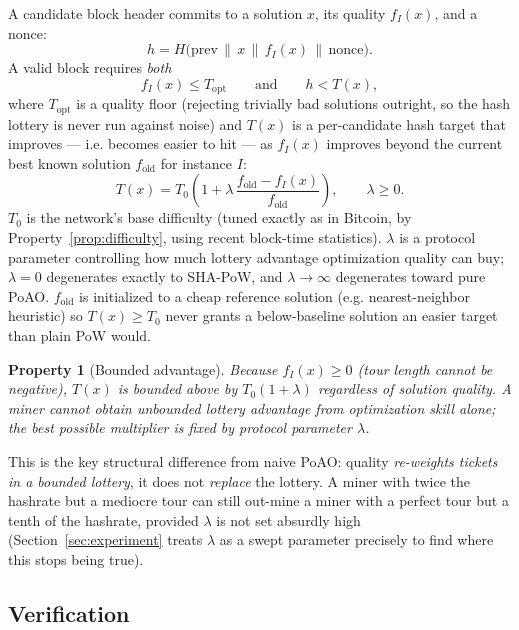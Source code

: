 \documentclass[journal]{IEEEtran}
\newtheorem{property}{Property}
\begin{document}
A candidate block header commits to a solution $x$, its quality $f_I(x)$, and
a nonce:
\[
h = H\big(\text{prev} \,\|\, x \,\|\, f_I(x) \,\|\, \text{nonce}\big).
\]
A valid block requires \emph{both}
\[
f_I(x) \le T_{\text{opt}}
\qquad\text{and}\qquad
h < T(x),
\]
where $T_{\text{opt}}$ is a quality floor (rejecting trivially bad solutions
outright, so the hash lottery is never run against noise) and $T(x)$ is a
per-candidate hash target that improves --- i.e. becomes easier to hit --- as
$f_I(x)$ improves beyond the current best known solution $f_{\text{old}}$ for
instance $I$:
\[
T(x) = T_0 \left( 1 + \lambda \, \frac{f_{\text{old}} - f_I(x)}{f_{\text{old}}} \right),
\qquad \lambda \ge 0 .
\]
$T_0$ is the network's base difficulty (tuned exactly as in Bitcoin, by
Property~\ref{prop:difficulty}, using recent block-time statistics). $\lambda$
is a protocol parameter controlling how much lottery advantage optimization
quality can buy; $\lambda = 0$ degenerates exactly to SHA-PoW, and
$\lambda \to \infty$ degenerates toward pure PoAO. $f_{\text{old}}$ is
initialized to a cheap reference solution (e.g. nearest-neighbor heuristic) so
$T(x) \ge T_0$ never grants a below-baseline solution an easier target than
plain PoW would.

\begin{property}[Bounded advantage]
\label{prop:bounded}
Because $f_I(x) \ge 0$ (tour length cannot be negative), $T(x)$ is bounded
above by $T_0(1+\lambda)$ regardless of solution quality. A miner cannot
obtain unbounded lottery advantage from optimization skill alone; the best
possible multiplier is fixed by protocol parameter $\lambda$.
\end{property}

This is the key structural difference from naive PoAO: quality \emph{re-weights
tickets in a bounded lottery}, it does not \emph{replace} the lottery. A miner
with twice the hashrate but a mediocre tour can still out-mine a miner with a
perfect tour but a tenth of the hashrate, provided $\lambda$ is not set
absurdly high (Section~\ref{sec:experiment} treats $\lambda$ as a swept
parameter precisely to find where this stops being true).

\subsection{Verification}
\end{document}
